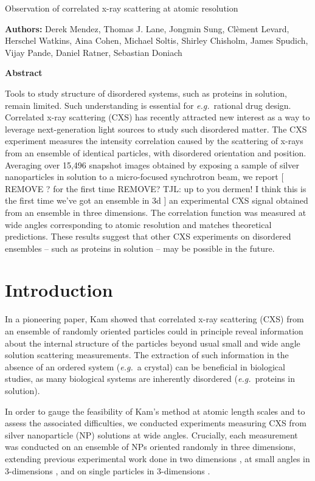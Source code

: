 \documentclass [11pt,fleqn]{article}
\def \hfb {\hfill\break}
\begin{document}
 
\hspace{1cm}{\bf Title:} Observation of correlated x-ray scattering at atomic resolution \hfb
 
{\bf Authors:} Derek Mendez, Thomas J. Lane, Jongmin Sung,  Cl\`ement Levard, Herschel Watkins, Aina Cohen, Michael Soltis, Shirley Chisholm, James Spudich, Vijay Pande,  Daniel Ratner, Sebastian Doniach

{\bf Abstract}

Tools to study structure of disordered systems, such as proteins in solution, remain limited. Such understanding is essential for \emph{e.g.}~rational drug design. Correlated x-ray scattering (CXS) has recently attracted new interest as a way to leverage next-generation light sources to study such disordered matter. The CXS experiment measures the intensity correlation caused by the scattering of x-rays from an ensemble of identical particles, with disordered orientation and position. Averaging over 15,496 snapshot images obtained by exposing a sample of silver nanoparticles in solution to a micro-focused synchrotron beam, we report [ REMOVE ? for the first time REMOVE? TJL: up to you dermen! I think this is the first time we've got an ensemble in 3d ] an experimental CXS signal obtained from an ensemble in three dimensions. The correlation function was measured at  wide angles corresponding to atomic resolution and matches theoretical predictions. These results suggest that other CXS experiments on disordered ensembles -- such as proteins in solution -- may be possible in the future.


\section{Introduction}

In a pioneering paper, Kam \cite{Kam:1977wc} showed that correlated x-ray scattering (CXS) from an ensemble of randomly oriented particles could in principle reveal information about the internal structure of the particles beyond usual small and wide angle solution scattering measurements. The extraction of such information in the absence of an ordered system (\textit{e.g.}~a crystal) can be beneficial in biological studies, as many biological systems are inherently disordered (\textit{e.g.}~proteins in solution).

In order to gauge the feasibility of Kam's method at atomic length scales and to assess the associated difficulties, we conducted experiments measuring CXS from silver nanoparticle (NP) solutions at wide angles. Crucially, each measurement was conducted on an ensemble of NPs oriented randomly in three dimensions, extending previous experimental work done in two dimensions \cite{Saldin:2011ch}, at small angles in 3-dimensions \cite{Kam:1981ua, Wochner:2009ia}, and on single particles in 3-dimensions \cite{Kam:1985tz, Starodub:1fy}. 
\end{document}
